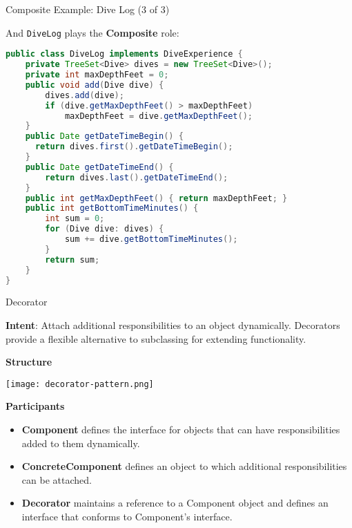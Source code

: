 \documentclass{beamer}
\begin{document}
\begin{frame}[fragile]{Composite Example: Dive Log (3 of 3)}

\vspace{-.07in}
And {\tt DiveLog} plays the {\bf Composite} role:
\vspace{-.05in}
\begin{lstlisting}[language=Java]
public class DiveLog implements DiveExperience {
    private TreeSet<Dive> dives = new TreeSet<Dive>();
    private int maxDepthFeet = 0;
    public void add(Dive dive) {
        dives.add(dive);
        if (dive.getMaxDepthFeet() > maxDepthFeet)
            maxDepthFeet = dive.getMaxDepthFeet();
    }
    public Date getDateTimeBegin() { 
      return dives.first().getDateTimeBegin();
    }
    public Date getDateTimeEnd() {
        return dives.last().getDateTimeEnd();
    }
    public int getMaxDepthFeet() { return maxDepthFeet; }
    public int getBottomTimeMinutes() {
        int sum = 0;
        for (Dive dive: dives) {
            sum += dive.getBottomTimeMinutes();
        }
        return sum;
    }
}
\end{lstlisting}



\end{frame}


\begin{frame}[fragile]{Decorator}


{\bf Intent}: Attach additional responsibilities to an object dynamically. Decorators provide a flexible alternative to subclassing for extending functionality.

{\bf Structure}
\vspace{-.1in}
\begin{center}
\texttt{[image: decorator-pattern.png]}\\
\end{center}
\vspace{-.125in}
{\bf Participants}
\begin{itemize}
\item {\bf Component} defines the interface for objects that can have responsibilities added to them dynamically.
\item {\bf ConcreteComponent} defines an object to which additional responsibilities can be attached.
\item {\bf Decorator} maintains a reference to a Component object and defines an interface that conforms to Component's interface.
\end{itemize}


\end{frame}
\end{document}
